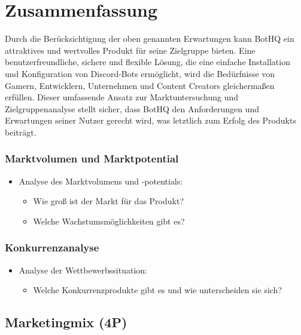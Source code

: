 \section{Zusammenfassung}

Durch die Berücksichtigung der oben genannten Erwartungen kann BotHQ ein attraktives und wertvolles Produkt für seine Zielgruppe bieten. Eine benutzerfreundliche, sichere und flexible Lösung, die eine einfache Installation und Konfiguration von Discord-Bots ermöglicht, wird die Bedürfnisse von Gamern, Entwicklern, Unternehmen und Content Creators gleichermaßen erfüllen.
Dieser umfassende Ansatz zur Marktuntersuchung und Zielgruppenanalyse stellt sicher, dass BotHQ den Anforderungen und Erwartungen seiner Nutzer gerecht wird, was letztlich zum Erfolg des Produkts beiträgt.

\subsubsection{Marktvolumen und Marktpotential}\label{marktvolumen-und-marktpotential}

\begin{itemize}
\item
  Analyse des Marktvolumens und -potentials:

  \begin{itemize}
  \item
    Wie groß ist der Markt für das Produkt?
  \item
    Welche Wachstumsmöglichkeiten gibt es?
  \end{itemize}
\end{itemize}

\subsubsection{Konkurrenzanalyse}\label{konkurrenzanalyse}

\begin{itemize}
\item
  Analyse der Wettbewerbssituation:

  \begin{itemize}
  
  \item
    Welche Konkurrenzprodukte gibt es und wie unterscheiden sie sich?
  \end{itemize}
\end{itemize}

\subsection{Marketingmix (4P)}\label{marketingmix-4p}

